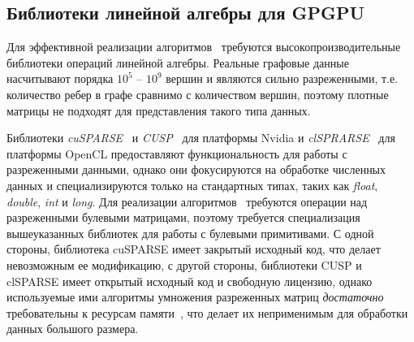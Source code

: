 \subsection{Библиотеки линейной алгебры для GPGPU}

Для эффективной реализации алгоритмов~\cite{inbook:kronecker_cfpq_adbis, inproceedings:matrix_cfpq} требуются высокопроизводительные библиотеки операций линейной алгебры. 
Реальные графовые данные насчитывают порядка $10^5$ -- $10^9$ вершин и являются сильно разреженными, т.е. количество ребер в графе сравнимо с количеством вершин, поэтому плотные матрицы не подходят для представления такого типа данных. 



Библиотеки \textit{cuSPARSE}~\cite{net:cusparse_docs} и \textit{CUSP}~\cite{net:cusplibrary} для платформы Nvidia и \textit{clSPRARSE}~\cite{10.1145/2909437.2909442} для платформы OpenCL предоставляют функциональность для работы с разреженными данными, однако они фокусируются на обработке численных данных и специализируются только на стандартных типах, таких как \textit{float}, \textit{double}, \textit{int} и \textit{long}. Для реализации алгоритмов~\cite{inbook:kronecker_cfpq_adbis, inproceedings:matrix_cfpq} требуются операции над разреженными булевыми матрицами, поэтому требуется специализация вышеуказанных библиотек для работы с булевыми примитивами. С одной стороны, библиотека cuSPARSE имеет закрытый исходный код, что делает невозможным ее модификацию, с другой стороны, библиотеки CUSP и clSPARSE имеет открытый исходный код и свободную лицензию, однако используемые ими алгоритмы умножения разреженных матриц \textit{достаточно} требовательны к ресурсам памяти~\cite{inproceedings:cfqp_matrix_with_single_source}, что делает их неприменимым для обработки данных большого размера.

